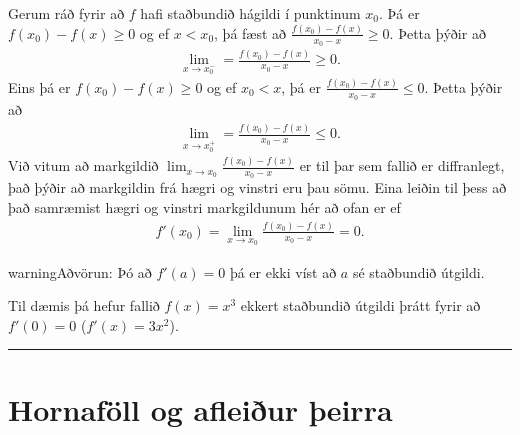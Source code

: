 \documentclass[a4paper,10pt,icelandic]{sphinxmanual}
\begin{document}
Gerum ráð fyrir að \(f\) hafi staðbundið hágildi í punktinum \(x_0\).
Þá er \(f(x_0)-f(x)\geq 0\) og ef \(x<x_0\),
þá fæst að  \(\frac{f(x_0)-f(x)}{x_0-x}\geq 0\). Þetta þýðir að
\begin{equation*}
\begin{split}\lim_{x \to x_0^-} = \frac{f(x_0) - f(x)}{x_0-x} \geq 0.
    \label{vinstri}\end{split}
\end{equation*}
Eins þá er \(f(x_0)-f(x)\geq 0\) og ef \(x_0<x\),
þá er \(\frac{f(x_0)-f(x)}{x_0-x} \leq 0\).
Þetta þýðir að
\begin{equation*}
\begin{split}\lim_{x \to x_0^+} = \frac{f(x_0) - f(x)}{x_0-x} \leq 0.
    \label{haegri}\end{split}
\end{equation*}
Við vitum að markgildið
\(\lim_{x\to x_0} \frac{f(x_0)-f(x)}{x_0-x}\) er til þar sem fallið
er diffranlegt, það þýðir að markgildin frá hægri og vinstri eru þau
sömu. Eina leiðin til þess að það samræmist hægri og vinstri markgildunum
hér að ofan er ef
\begin{equation*}
\begin{split}f'(x_0) = \lim_{x\to x_0} \frac{f(x_0)-f(x)}{x_0-x} = 0.\end{split}
\end{equation*}
\begin{DUlineblock}{0em}
\item[] 
\item[] 
\end{DUlineblock}

\begin{sphinxadmonition}{warning}{Aðvörun:}
Þó að \(f'(a)=0\) þá er ekki víst að \(a\) sé staðbundið útgildi.

Til dæmis þá hefur fallið \(f(x) = x^3\) ekkert staðbundið útgildi
þrátt fyrir að \(f'(0) = 0\) (\(f'(x) = 3x^2\)).
\end{sphinxadmonition}


\bigskip\hrule\bigskip



\section{Hornaföll og afleiður þeirra}
\label{\detokenize{kafli03:hornafoll-og-afleiur-eirra}}
\end{document}

